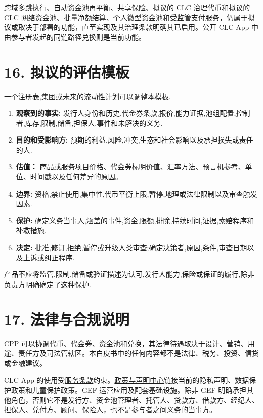\documentclass[11pt]{article}
\begin{document}
跨域多跳执行、自动资金池再平衡、共享保险、拟议的 CLC 治理代币和拟议的 CLC 网络资金池、批量净额结算、个人微型资金池和受监管支付服务，仍属于拟议或取决于部署的功能，直至实现及其治理条款明确其已启用。公开 CLC App 中由参与者发起的同链路径兑换则是当前功能。


\section*{16. 拟议的评估模板}

一个注册表,集团或未来的流动性计划可以调整本模板.

\begin{enumerate}[leftmargin=*]
\item \textbf{观察到的事实:} 发行人身份和历史,代金券条款,报价,能力证据,池组配置,控制者,库存,限制,储备,担保人,事件和未解决的义务.
\item \textbf{目的和受影响方:} 预期的利益,风险,冲突,生态和社会影响以及承担损失或责任的人.
\item \textbf{估值：} 商品或服务项目价格、代金券标明价值、汇率方法、预言机参考、单位、时间戳以及任何差异的原因。
\item \textbf{边界:} 资格,禁止使用,集中性,代币平衡上限,暂停,地理或法律限制以及审查触发因素.
\item \textbf{保护:} 确定义务当事人,涵盖的事件,资金,限额,排除,持续时间,证据,索赔程序和补救措施.
\item \textbf{决定:} 批准,修订,拒绝,暂停或升级人类审查;确定决策者,原因,条件,审查日期以及上诉或纠正程序.
\end{enumerate}
产品不应将监管,限制,储备或验证描述为认可,发行人能力,保险或保证的履行,除非负责方明确确定了这种保护.


\section*{17. 法律与合规说明}

CPP 可以协调代币、代金券、资金池和兑换，其法律待遇取决于设计、营销、用途、责任方及司法管辖区。本白皮书中的任何内容都不是法律、税务、投资、信贷或金融建议。

CLC App 的使用受\href{https://docs.cosmolocal.credit/zh/governance/terms}{服务条款}约束。\href{https://docs.cosmolocal.credit/zh/governance/policies}{政策与声明中心}链接当前的隐私声明、数据保护政策和儿童保护政策。GEF 运营应用及配套基础设施。除非 GEF 明确承担其他角色，否则它不是发行方、资金池管理者、托管人、贷款方、借款方、经纪人、担保人、兑付方、顾问、保险人，也不是参与者之间义务的当事方。
\end{document}
